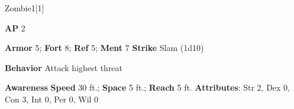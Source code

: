 \begin{monsection}{Zombie}{1}[1]
\vspace{-1em}\vspace{-1em}
\begin{spellcontent}
\begin{spelltargetinginfo}
{\textbf{AP} 2}

\pari \textbf{Armor} 5;
\textbf{Fort} 8;
\textbf{Ref} 5;
\textbf{Ment} 7
\pari \textbf{Strike} Slam  (1d10)



\pari \textbf{Behavior} Attack highest threat
\end{spelltargetinginfo}
\end{spellcontent}

\begin{monsterfooter}
\pari \textbf{Awareness} 
\pari \textbf{Speed} 30 ft.;
\textbf{Space} 5 ft.;
\textbf{Reach} 5 ft.
\pari \textbf{Attributes}:
Str 2,
Dex 0,
Con 3,
Int 0,
Per 0,
Wil 0
\end{monsterfooter}
\end{monsection}

